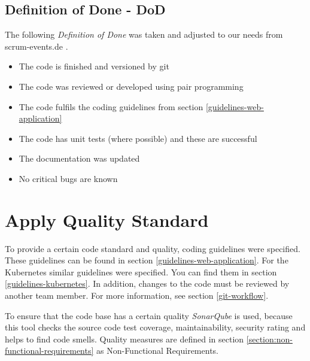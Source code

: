 \subsection{Definition of Done - DoD}
The following \textit{Definition of Done} was taken and adjusted to our needs from scrum-events.de \cite{www.scrum-events.de_dod}.
\begin{itemize}
  \item The code is finished and versioned by git
  \item The code was reviewed or developed using pair programming
  \item The code fulfils the coding guidelines from section \ref{guidelines-web-application}
  \item The code has unit tests (where possible) and these are successful
  \item The documentation was updated
  \item No critical bugs are known
\end{itemize}

\section{Apply Quality Standard}
To provide a certain code standard and quality, coding guidelines were specified.
These guidelines can be found in section \ref{guidelines-web-application}.
For the Kubernetes similar guidelines were specified.
You can find them in section \ref{guidelines-kubernetes}.
In addition, changes to the code must be reviewed by another team member.
For more information, see section \ref{git-workflow}.

To ensure that the code base has a certain quality \textit{SonarQube} is used, because this tool checks the source code test coverage, maintainability, security rating and helps to find code smells.
Quality measures are defined in section \ref{section:non-functional-requirements} as Non-Functional Requirements.